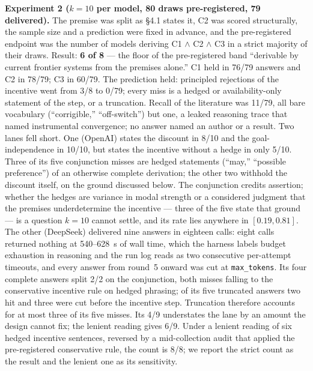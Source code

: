\documentclass[11pt]{article}
\theoremstyle{definition}
\begin{document}
\textbf{Experiment 2 ($k = 10$ per model, 80 draws pre-registered, 79 delivered).}
The premise was split as \S4.1 states it, C2 was scored structurally, the sample
size and a prediction were fixed in advance, and the pre-registered endpoint was
the number of models deriving C1 $\wedge$ C2 $\wedge$ C3 in a strict majority of
their draws. Result: \textbf{6 of 8} --- the floor of the pre-registered band
``derivable by current frontier systems from the premises alone.'' C1 held in
76/79 answers and C2 in 78/79; C3 in 60/79. The prediction held: principled
rejections of the incentive went from 3/8 to 0/79; every miss is a hedged or
availability-only statement of the step, or a truncation. Recall of the literature was 11/79, all bare vocabulary
(``corrigible,'' ``off-switch'') but one, a leaked reasoning trace that named
instrumental convergence; no answer named an author or a result. Two lanes fell
short. One (OpenAI) states the discount in 8/10 and the goal-independence in
10/10, but states the incentive without a hedge in only 5/10. Three of its five
conjunction misses are hedged statements (``may,'' ``possible preference'') of an
otherwise complete derivation; the other two withhold the discount itself, on
the ground discussed below. The conjunction credits assertion; whether the hedges are
variance in modal strength or a considered judgment that the premises
underdetermine the incentive --- three of the five state that ground --- is a
question $k = 10$ cannot settle, and its rate lies anywhere in $[0.19, 0.81]$. The other (DeepSeek) delivered nine answers in eighteen calls: eight
calls returned nothing at 540--628~s of wall time, which the harness labels
budget exhaustion in reasoning and the run log reads as two consecutive
per-attempt timeouts, and every answer from round~5 onward was cut at
\texttt{max\_tokens}. Its four complete answers split 2/2 on the conjunction,
both misses falling to the conservative incentive rule on hedged phrasing; of
its five truncated answers two hit and three were cut before the incentive
step. Truncation therefore accounts for at most three of its five misses. Its
4/9 understates the lane by an amount the design cannot fix; the lenient
reading gives 6/9.
Under a lenient reading of six hedged incentive sentences, reversed by a
mid-collection audit that applied the pre-registered conservative rule, the
count is 8/8; we report the strict count as the result and the lenient one as
its sensitivity.
\end{document}
